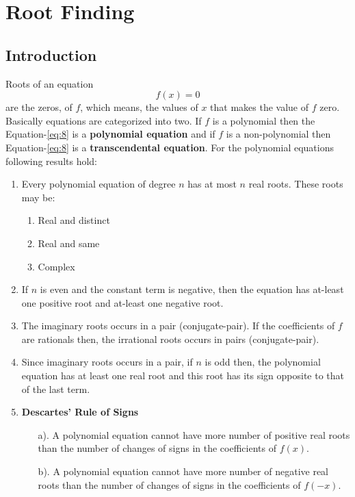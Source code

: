 \documentclass[aima203_lecturenotes_ku.tex]{subfiles}
\begin{document}
\chapter{Root Finding}
\section{Introduction}
Roots of an equation
\begin{equation}
  \label{eq:8}
f(x) = 0
\end{equation}
are the zeros, of \(f\), which means, the values of \(x\) that makes the value of \(f\) zero. Basically equations are categorized into two. If \(f\) is a polynomial then the Equation-\ref{eq:8} is a \textbf{polynomial equation} and if \(f\) is a non-polynomial then Equation-\ref{eq:8} is a \textbf{transcendental equation}. For the polynomial equations following results hold:
\begin{enumerate}
\item Every polynomial equation of degree \(n\) has at most \(n\) real roots. These roots may be:
  \begin{enumerate}
  \item Real and distinct
  \item Real and same
  \item Complex
  \end{enumerate}
\item If \(n\) is even and the constant term is negative, then the equation has at-least one positive root and at-least one negative root.
\item The imaginary roots occurs in a pair (conjugate-pair). If the coefficients of \(f\) are rationals then, the irrational roots occurs in pairs (conjugate-pair).
\item Since imaginary roots occurs in a pair, if \(n\) is odd then, the polynomial equation has at least one real root and this root has its sign opposite to that of the last term.

\item \textbf{Descartes' Rule of Signs}
  \begin{enumerate}
  \item[a).] A polynomial equation cannot have more number of positive real roots than the number of changes of signs in the coefficients of \(f(x)\).
  \item[b).] A polynomial equation cannot have more number of negative real roots than the number of changes of signs in the coefficients of \(f(-x)\).
  \end{enumerate}
\end{enumerate}
\end{document}
